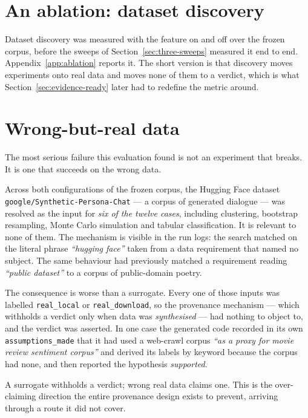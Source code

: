 \section{An ablation: dataset discovery}
\label{sec:ablation}

Dataset discovery was measured with the feature on and off over the frozen corpus,
before the sweeps of Section~\ref{sec:three-sweeps} measured it end to end.
Appendix~\ref{app:ablation} reports it. The short version is that discovery moves
experiments onto real data and moves none of them to a verdict, which is what
Section~\ref{sec:evidence-ready} later had to redefine the metric around.

\section{Wrong-but-real data}
\label{sec:wrong-data}

The most serious failure this evaluation found is not an experiment that breaks.
It is one that succeeds on the wrong data.

Across both configurations of the frozen corpus, the Hugging Face dataset
\texttt{google/Synthetic-Persona-Chat} --- a corpus of generated dialogue --- was
resolved as the input for \emph{six of the twelve cases}, including clustering,
bootstrap resampling, Monte Carlo simulation and tabular classification. It is
relevant to none of them. The mechanism is visible in the run logs: the search
matched on the literal phrase \emph{``hugging face''} taken from a data
requirement that named no subject. The same behaviour had previously matched a
requirement reading \emph{``public dataset''} to a corpus of public-domain poetry.

The consequence is worse than a surrogate. Every one of those inputs was labelled
\texttt{real\_local} or \texttt{real\_download}, so the provenance mechanism ---
which withholds a verdict only when data was \emph{synthesised} --- had nothing to
object to, and the verdict was asserted. In one case the generated code recorded
in its own \texttt{assumptions\_made} that it had used a web-crawl corpus
\emph{``as a proxy for movie review sentiment corpus''} and derived its labels by
keyword because the corpus had none, and then reported the hypothesis
\emph{supported}.

A surrogate withholds a verdict; wrong real data claims one. This is the
over-claiming direction the entire provenance design exists to prevent, arriving
through a route it did not cover.

